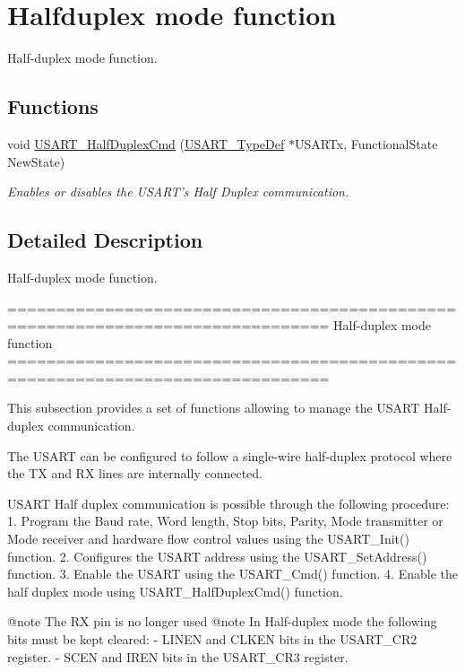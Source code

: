 \hypertarget{group___u_s_a_r_t___group5}{}\section{Halfduplex mode function}
\label{group___u_s_a_r_t___group5}


Half-\/duplex mode function.  


\subsection*{Functions}
\begin{DoxyCompactItemize}
\item 
void \hyperlink{group___u_s_a_r_t___group5_gaaa23b05fe0e1896bad90da7f82750831}{U\+S\+A\+R\+T\+\_\+\+Half\+Duplex\+Cmd} (\hyperlink{struct_u_s_a_r_t___type_def}{U\+S\+A\+R\+T\+\_\+\+Type\+Def} $\ast$U\+S\+A\+R\+Tx, Functional\+State New\+State)
\begin{DoxyCompactList}\small\item\em Enables or disables the U\+S\+A\+R\+T's Half Duplex communication. \end{DoxyCompactList}\end{DoxyCompactItemize}


\subsection{Detailed Description}
Half-\/duplex mode function. 

\begin{DoxyVerb} ===============================================================================
                         Half-duplex mode function
 ===============================================================================  

  This subsection provides a set of functions allowing to manage the USART 
  Half-duplex communication.
  
  The USART can be configured to follow a single-wire half-duplex protocol where 
  the TX and RX lines are internally connected.

  USART Half duplex communication is possible through the following procedure:
     1. Program the Baud rate, Word length, Stop bits, Parity, Mode transmitter 
        or Mode receiver and hardware flow control values using the USART_Init()
        function.
     2. Configures the USART address using the USART_SetAddress() function.
     3. Enable the USART using the USART_Cmd() function.
     4. Enable the half duplex mode using USART_HalfDuplexCmd() function.


@note The RX pin is no longer used
@note In Half-duplex mode the following bits must be kept cleared:
        - LINEN and CLKEN bits in the USART_CR2 register.
        - SCEN and IREN bits in the USART_CR3 register.\end{DoxyVerb}
 

